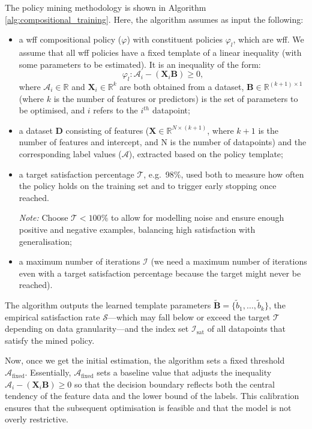 The policy mining methodology is shown in Algorithm \ref{alg:compositional_training}. Here, the algorithm assumes as input the following:
\begin{itemize}
    \item a wff compositional policy ($\varphi$) with constituent policies $\varphi_l$, which are wff. We assume that all wff policies have a fixed template of a linear inequality (with some parameters to be estimated). It is an inequality of the form:
 \begin{equation}
 \varphi_l : \mathcal{A}_i - (\mathbf{X}_i \mathbf{B}) \geq 0,
 \end{equation}
 where $\mathcal{A}_i \in \mathbb{R}$ and $\mathbf{X}_i \in \mathbb{R}^k$ are both obtained from a dataset, $\mathbf{B} \in \mathbb{R}^{(k+1) \times 1}$ (where $k$ is the number of features or predictors) is the set of parameters to be optimised, and $i$ refers to the $i^{th}$ datapoint;

    \item a dataset $\mathcal{\mathbf{D}}$ consisting of features ($\mathbf{X} \in \mathbb{R}^{N \times (k+1)}$, where $k+1$ is the number of features and intercept, and N is the number of datapoints) and the corresponding label values ($\mathcal{A}$), extracted based on the policy template;
   
   \item a target satisfaction percentage $\mathcal{T}$, e.g.\ 98\%, used both to measure how often the policy holds on the training set and to trigger early stopping once reached.

 \smallskip
 \noindent\emph{Note:}  Choose $\mathcal{T}<100\%$ to allow for modelling noise and ensure enough positive and negative examples, balancing high satisfaction with generalisation;


    \item a maximum number of iterations $\mathcal{I}$ (we need a maximum number of iterations even with a target satisfaction percentage because the target might never be reached). 
\end{itemize}

The algorithm outputs the learned template parameters $\tilde{\mathbf{B}} = \{\tilde{b}_1,\dots,\tilde{b}_k\}$, the empirical satisfaction rate $\mathcal{S}$—which may fall below or exceed the target $\mathcal{T}$ depending on data granularity—and the index set $\mathcal{I}_{\mathrm{sat}}$ of all datapoints that satisfy the mined policy.


Now, once we get the initial estimation, the algorithm sets a fixed threshold $\mathcal{A}_{\text{fixed}}$. Essentially, \( \mathcal{A}_{\text{fixed}} \) sets a baseline value that adjusts the inequality  $\mathcal{A}_i - (\mathbf{X}_i \mathbf{B}) \geq 0$ so that the decision boundary reflects both the central tendency of the feature data and the lower bound of the labels. This calibration ensures that the subsequent optimisation is feasible and that the model is not overly restrictive. 

